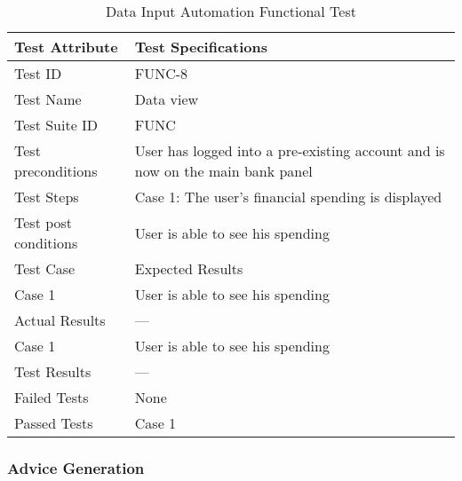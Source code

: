 \documentclass{article}
\begin{document}
\begin{table}[htbp]
\begin{center}
\begin{tabular}{|l | l|}
\hline
Test Attribute & Test Specifications \\
\hline
Test ID & FUNC-8 \\
\hline
Test Name  & Data view \\
\hline
Test Suite  ID & FUNC \\
\hline
Test preconditions & User has logged into a pre-existing account and is now on the main bank panel \\
\hline
Test Steps & Case 1: The user's financial spending is displayed\\
\hline
Test post conditions & User is able to see his spending \\
\hline
Test Case & Expected Results\\
\hline
Case 1  &  User is able to see his spending\\
\hline
Actual Results & ---\\
\hline
Case 1  &  User is able to see his spending\\
\hline
Test Results & ---\\
\hline
Failed Tests & None\\
\hline
Passed Tests & Case 1\\
\hline
\end{tabular}
\end{center}
\caption{Data Input Automation Functional Test}
\end{table}
\label{table:2h}

\clearpage

\subsubsection{Advice Generation}
\end{document}
